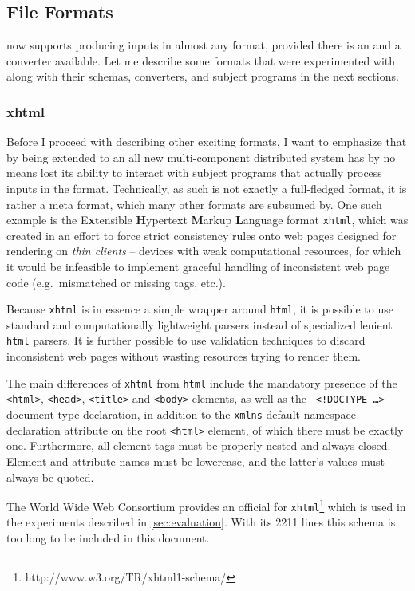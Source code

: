 \subsection{File Formats}
\label{sec:formats}
\xmlmate now supports producing inputs in almost any format, provided there is an \xsd and a converter
available. Let me describe some formats that were experimented with along with their schemas, converters, and
subject programs in the next sections.
\tocless\subsubsection{xhtml}
Before I proceed with describing other exciting formats, I want to emphasize that by being extended to an all
new multi-component distributed system \xmlmate has by no means lost its ability to interact with subject
programs that actually process inputs in the \xml format. Technically, \xml as such is not exactly a
full-fledged format, it is rather a meta format, which many other formats are subsumed by. One
such example is the E\textbf{x}tensible \textbf{H}ypertext \textbf{M}arkup \textbf{L}anguage format
\texttt{xhtml}, which was created in an effort to force strict consistency rules onto web pages designed for
rendering on \emph{thin clients} -- devices with weak computational resources, for which it would be infeasible
to implement graceful handling of inconsistent web page code (e.g.\ mismatched or missing tags, etc.). 
 
Because \texttt{xhtml} is in essence a simple \xml wrapper around \texttt{html}, it is possible to use standard
and computationally lightweight \xml parsers instead of specialized lenient \texttt{html} parsers. It is
further possible to use \xml validation techniques to discard inconsistent web pages without wasting resources trying
to render them.

The main differences of \texttt{xhtml} from \texttt{html} include the mandatory presence of the
\texttt{<html>}, \texttt{<head>}, \texttt{<title>} and \texttt{<body>} elements, as well as the \texttt{\small
<!DOCTYPE \ldots> } document type declaration, in addition to the \texttt{xmlns} default namespace declaration
attribute on the root \texttt{<html>} element, of which there must be exactly one. Furthermore, all element
tags must be properly nested and always closed. Element and attribute names must be lowercase, and the
latter's values must always be quoted.

The World Wide Web Consortium provides an official \xsd for
\texttt{xhtml}\footnote{http://www.w3.org/TR/xhtml1-schema/} which is used in the \xmlmate experiments
described in \cref{sec:evaluation}. With its 2211 lines this schema is too long to be included
in this document.

